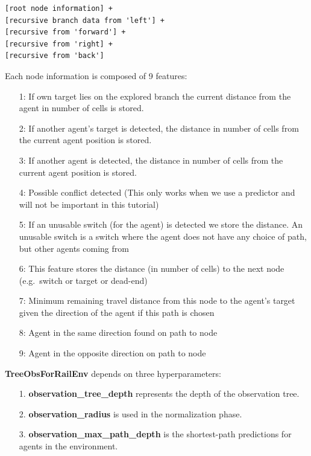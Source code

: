 \documentclass[11pt, a4paper, hidelinks]{report}
\begin{document}
\begin{lstlisting}[label={lst:tree-obs}]
[root node information] +
[recursive branch data from 'left'] +
[recursive from 'forward'] +
[recursive from 'right] +
[recursive from 'back']
\end{lstlisting}

Each node information is composed of 9 features:

\begin{enumerate}
\item [1:]If own target lies on the explored branch the current distance from the agent in number of cells is stored.
\item [2:]If another agent’s target is detected, the distance in number of cells from the current agent position is stored.
\item [3:]If another agent is detected, the distance in number of cells from the current agent position is stored.
\item [4:]Possible conflict detected (This only works when we use a predictor and will not be important in this tutorial)
\item [5:]If an unusable switch (for the agent) is detected we store the distance.
An unusable switch is a switch where the agent does not have any choice of path, but other agents coming from
\item [6:]This feature stores the distance (in number of cells) to the next node (e.g.\ switch or target or dead-end)
\item [7:]Minimum remaining travel distance from this node to the agent’s target given the direction of the agent if this path is chosen
\item [8:]Agent in the same direction found on path to node
\item [9:]Agent in the opposite direction on path to node
\end{enumerate}

\textbf{TreeObsForRailEnv} depends on three hyperparameters:

\begin{enumerate}
\item [1.] \textbf{observation\_tree\_depth} represents the depth of the observation tree.
\item [2.] \textbf{observation\_radius} is used in the normalization phase.
\item [3.] \textbf{observation\_max\_path\_depth} is the shortest-path predictions for agents in the environment.
\end{enumerate}
\end{document}
